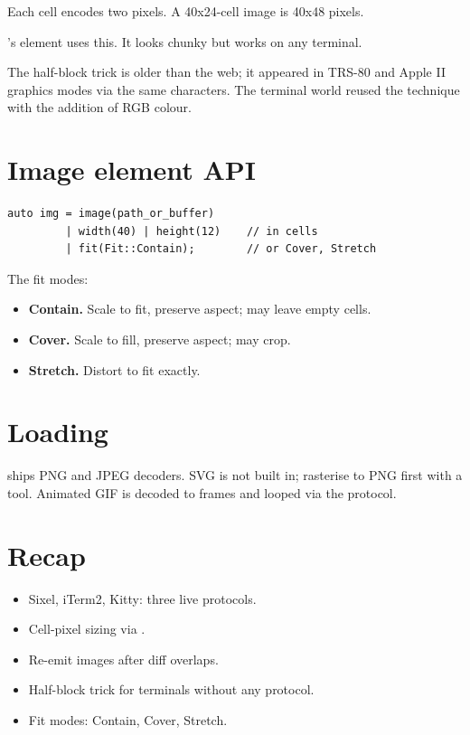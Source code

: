 Each cell encodes two pixels. A 40x24-cell image is 40x48 pixels.

\maya{}'s  element uses this. It looks
chunky but works on any terminal.

\begin{funfact}
The half-block trick is older than the web; it appeared in
TRS-80 and Apple II graphics modes via the same characters.
The terminal world reused the technique with the addition of
RGB colour.
\end{funfact}

\section{Image element API}

\begin{lstlisting}
auto img = image(path_or_buffer)
         | width(40) | height(12)    // in cells
         | fit(Fit::Contain);        // or Cover, Stretch
\end{lstlisting}

The fit modes:
\begin{itemize}[leftmargin=*]
  \item \textbf{Contain.} Scale to fit, preserve aspect; may
    leave empty cells.
  \item \textbf{Cover.} Scale to fill, preserve aspect; may
    crop.
  \item \textbf{Stretch.} Distort to fit exactly.
\end{itemize}

\section{Loading}

\maya{} ships PNG and JPEG decoders. SVG is not built in;
rasterise to PNG first with a tool. Animated GIF is decoded
to frames and looped via the protocol.

\section{Recap}

\begin{recap}
\begin{itemize}[leftmargin=*]
  \item Sixel, iTerm2, Kitty: three live protocols.
  \item Cell-pixel sizing via \code{ESC [ 16 t}.
  \item Re-emit images after diff overlaps.
  \item Half-block trick for terminals without any protocol.
  \item Fit modes: Contain, Cover, Stretch.
\end{itemize}
\end{recap}

